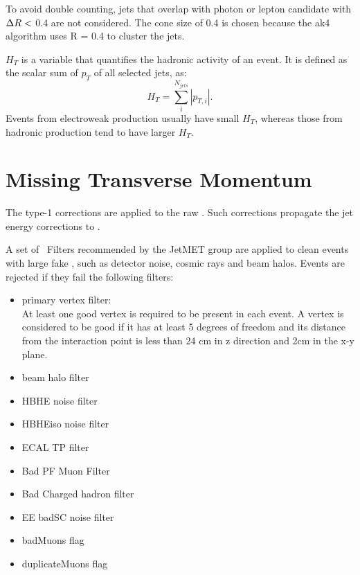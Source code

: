 \documentclass[thesis.tex]{subfiles}
\renewcommand\_{\textunderscore\allowbreak}
\begin{document}
To avoid double counting, jets that overlap with photon or lepton candidate with $\Delta R <$ 0.4 are not considered.
The cone size of 0.4 is chosen because the ak4 algorithm uses R = 0.4 to cluster the jets.  

$H_T$ is a variable that quantifies the hadronic activity of an event. 
It is defined as the scalar sum of $p_T$ of all selected jets, as:
	\begin{equation*}
		 H_T = \sum_i^{N_{jets}}|p_{T,i}|.
	\end{equation*}
Events from electroweak production usually have small $H_T$, whereas those from hadronic production tend to have larger $H_T$. 


\section{Missing Transverse Momentum}
\label{type-1-corr}
The type-1 corrections are applied to the raw \MET. Such corrections propagate the jet energy corrections to \MET.

A set of \MET~Filters recommended by the JetMET group are applied to clean events with large fake \MET, such as detector noise, cosmic rays and beam halos. Events are rejected if they fail the following filters:
\begin{center}
\begin{itemize}
\item primary vertex filter:\\
		At least one good vertex is required to be present in each event. A vertex is considered to be good if it has at least 5 degrees of freedom and its distance from the interaction point is less than 24 cm in z direction and 2cm in the x-y plane. 
\item beam halo filter
\item HBHE noise filter
\item HBHEiso noise filter
\item ECAL TP filter
\item Bad PF Muon Filter
\item Bad Charged hadron filter
\item EE badSC noise filter
\item badMuons flag
\item duplicateMuons flag
\end{itemize}
\end{center}
\end{document}
